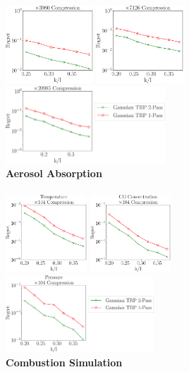 \begin{figure}
	\centering
	\includegraphics[height=2.9cm]{figure/multi_ABSORB_frk8.pdf}
	\includegraphics[height=2.9cm]{figure/multi_ABSORB_frk10.pdf}
	\includegraphics[height=2.9cm]{figure/multi_ABSORB_frk15.pdf}\\
	\textbf{Aerosol Absorption}\\~\\
	\includegraphics[height=2.9cm]{figure/multi_T_frk10.pdf}
	\includegraphics[height=2.9cm]{figure/multi_CO_frk10.pdf}
	\includegraphics[height=2.9cm]{figure/multi_P_frk10.pdf}\\
	\textbf{Combustion Simulation}\\

\end{figure}
